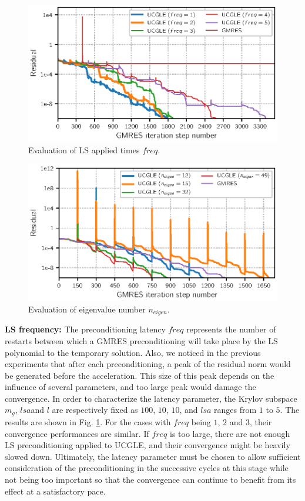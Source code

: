 \begin{figure}[htbp]
	\centering
	\includegraphics[width=6.2in]{fig/conv_lsfreq.eps}
	\caption{Evaluation of LS applied times $freq$.}
	\label{fig:Lsfreq}
\end{figure}

\begin{figure}[htbp]
	\centering
	\includegraphics[width=6.2in]{fig/conv_eigenvalues.eps}
	\caption{Evaluation of eigenvalue number $n_{eigen}$.}
	\label{fig:vals}
\end{figure}

\textbf{LS frequency: }The preconditioning latency $freq$ represents the number of restarts between which a GMRES preconditioning will take place by the LS polynomial to the temporary solution. Also, we noticed in the previous experiments that after each preconditioning, a peak of the residual norm would be generated before the acceleration. This size of this peak depends on the influence of several parameters, and too large peak would damage the convergence.  In order to characterize the latency parameter, the Krylov subspace $m_g$, $lsa$and $l$ are respectively fixed as $100$, $10$, $10$, and $lsa$ ranges from $1$ to $5$. The results are shown in Fig. \ref{fig:Lsfreq}. For the cases with $freq$ being $1$, $2$ and $3$, their convergence performances are similar. If $freq$ is too large,  there are not enough LS preconditioning applied to UCGLE, and their convergence might be heavily slowed down. Ultimately, the latency parameter must be chosen to allow sufficient consideration of the preconditioning in the successive cycles at this stage while not being too important so that the convergence can continue to benefit from its effect at a satisfactory pace.


